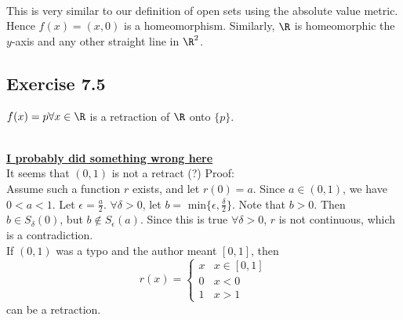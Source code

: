 \begin{solution}
 \\This is very similar to our definition of open sets using the absolute value metric. Hence $f(x) = (x,0)$ is a homeomorphism. Similarly, $\R$ is homeomorphic the $y$-axis and any other straight line in $\R^2$.
\end{solution}

\subsection{Exercise 7.5}
\setcounter{question}{0}


\begin{solution}
 $f(x) = p \forall x \in \R$ is a retraction of $\R$ onto $\{p\}$.
\end{solution}


\begin{solution}
 \\\underline{\textbf{I probably did something wrong here}} \\
 It seems that $(0,1)$ is not a retract (?) Proof: \\
 Assume such a function $r$ exists, and let $r(0) = a$. Since $a \in (0,1)$, we have $0 < a < 1$. Let $\epsilon = \frac{a}{2}$. $\forall \delta > 0$, let $b =$ min$\{\epsilon, \frac{\delta}{2}\}$. Note that $b > 0$. Then $b \in S_\delta(0)$, but $b \notin S_\epsilon(a)$. Since this is true $\forall \delta > 0$, $r$ is not continuous, which is a contradiction. \\
 If $(0,1)$ was a typo and the author meant $[0,1]$, then $$r(x) = \begin{cases} x & x \in [0,1] \\ 0 & x<0 \\ 1 & x > 1 \end{cases}$$ can be a retraction.
\end{solution}


